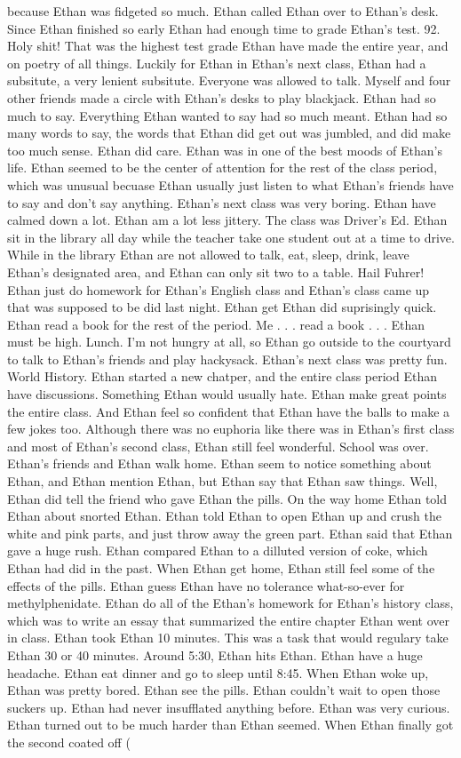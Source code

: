 \documentclass[12pt]{book}
\begin{document}
because Ethan was fidgeted so much. Ethan called Ethan over to Ethan's desk. Since Ethan finished so early Ethan had enough time to grade Ethan's test. 92. Holy shit! That was the highest test grade Ethan have made the entire year, and on poetry of all things. Luckily for Ethan in Ethan's next class, Ethan had a subsitute, a very lenient subsitute. Everyone was allowed to talk. Myself and four other friends made a circle with Ethan's desks to play blackjack. Ethan had so much to say. Everything Ethan wanted to say had so much meant. Ethan had so many words to say, the words that Ethan did get out was jumbled, and did make too much sense. Ethan did care. Ethan was in one of the best moods of Ethan's life. Ethan seemed to be the center of attention for the rest of the class period, which was unusual becuase Ethan usually just listen to what Ethan's friends have to say and don't say anything. Ethan's next class was very boring. Ethan have calmed down a lot. Ethan am a lot less jittery. The class was Driver's Ed. Ethan sit in the library all day while the teacher take one student out at a time to drive. While in the library Ethan are not allowed to talk, eat, sleep, drink, leave Ethan's designated area, and Ethan can only sit two to a table. Hail Fuhrer! Ethan just do homework for Ethan's English class and Ethan's class came up that was supposed to be did last night. Ethan get Ethan did suprisingly quick. Ethan read a book for the rest of the period. Me . . .  read a book . . .  Ethan must be high. Lunch. I'm not hungry at all, so Ethan go outside to the courtyard to talk to Ethan's friends and play hackysack. Ethan's next class was pretty fun. World History. Ethan started a new chatper, and the entire class period Ethan have discussions. Something Ethan would usually hate. Ethan make great points the entire class. And Ethan feel so confident that Ethan have the balls to make a few jokes too. Although there was no euphoria like there was in Ethan's first class and most of Ethan's second class, Ethan still feel wonderful. School was over. Ethan's friends and Ethan walk home. Ethan seem to notice something about Ethan, and Ethan mention Ethan, but Ethan say that Ethan saw things. Well, Ethan did tell the friend who gave Ethan the pills. On the way home Ethan told Ethan about snorted Ethan. Ethan told Ethan to open Ethan up and crush the white and pink parts, and just throw away the green part. Ethan said that Ethan gave a huge rush. Ethan compared Ethan to a dilluted version of coke, which Ethan had did in the past. When Ethan get home, Ethan still feel some of the effects of the pills. Ethan guess Ethan have no tolerance what-so-ever for methylphenidate. Ethan do all of the Ethan's homework for Ethan's history class, which was to write an essay that summarized the entire chapter Ethan went over in class. Ethan took Ethan 10 minutes. This was a task that would regulary take Ethan 30 or 40 minutes. Around 5:30, Ethan hits Ethan. Ethan have a huge headache. Ethan eat dinner and go to sleep until 8:45. When Ethan woke up, Ethan was pretty bored. Ethan see the pills. Ethan couldn't wait to open those suckers up. Ethan had never insufflated anything before. Ethan was very curious. Ethan turned out to be much harder than Ethan seemed. When Ethan finally got the second coated off ( 
\end{document}
